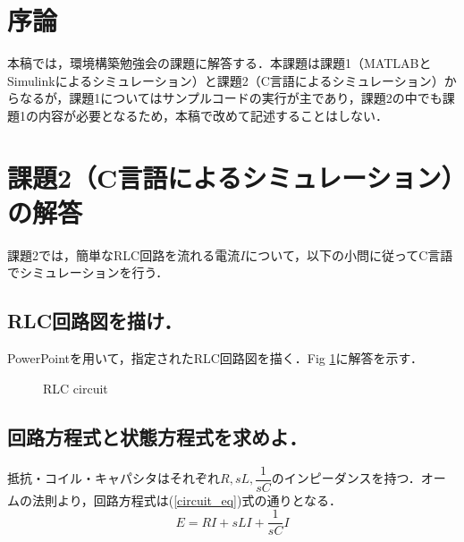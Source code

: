\documentclass[a4paper,10pt,twocolumn,fleqn]{jarticle}
\begin{document}
{}

\section{序論}
  本稿では，環境構築勉強会の課題に解答する．本課題は課題1（MATLABとSimulinkによるシミュレーション）と課題2（C言語によるシミュレーション）からなるが，課題1についてはサンプルコードの実行が主であり，課題2の中でも課題1の内容が必要となるため，本稿で改めて記述することはしない．

\section{課題2（C言語によるシミュレーション）の解答}
  課題2では，簡単なRLC回路を流れる電流$I$について，以下の小問に従ってC言語でシミュレーションを行う．

  \subsection{RLC回路図を描け．}
    PowerPoint\textregistered を用いて，指定されたRLC回路図を描く．Fig \ref{RLC_circuit}に解答を示す．

    \begin{figure}[htbp]
      \begin{center}
        \caption{RLC circuit}
        \label{RLC_circuit}
      \end{center}
    \end{figure}

  \subsection{回路方程式と状態方程式を求めよ．}
    抵抗・コイル・キャパシタはそれぞれ$R, sL, \dfrac{1}{sC}$のインピーダンスを持つ．オームの法則より，回路方程式は(\ref{circuit_eq})式の通りとなる．
    \begin{equation}
      \label{circuit_eq}
      E = RI + sLI + \frac{1}{sC} I
    \end{equation}
\end{document}
